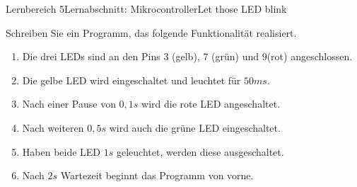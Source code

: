 \documentclass[oneside,openany,headings=optiontotoc,11pt,numbers=noenddot]{scrreprt}
\begin{document}
		\begin{worksheet}{Lernbereich 5}{Lernabschnitt: Mikrocontroller}{Let those LED blink}
			\begin{framed}
				\noindent
				Schreiben Sie ein Programm, das folgende Funktionalität realisiert.
				\begin{enumerate}[label=(\Roman{*})]
					\item Die drei LEDs sind an den Pins 3 (gelb), 7 (grün) und 9(rot) angeschlossen.
					\item Die gelbe LED wird eingeschaltet und leuchtet für \(50ms\).
					\item Nach einer Pause von \(0,1s\) wird die rote LED angeschaltet.
					\item Nach weiteren \(0,5s\) wird auch die grüne LED eingeschaltet.
					\item Haben beide LED \(1s\) geleuchtet, werden diese ausgeschaltet.
					\item Nach \(2s\) Wartezeit beginnt das Programm von vorne.
				\end{enumerate}
			\end{framed}
		\end{worksheet}
\end{document}
